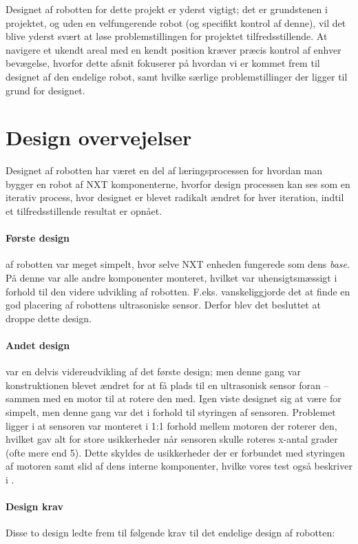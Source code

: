 Designet af robotten for dette projekt er yderst vigtigt; det er grundstenen i projektet, og uden en velfungerende robot (og specifikt kontrol af denne), vil det blive yderst svært at løse problemstillingen for projektet tilfredsstillende.
At navigere et ukendt areal med en kendt position kræver præcis kontrol af enhver bevægelse, hvorfor dette afsnit fokuserer på hvordan vi er kommet frem til designet af den endelige robot, samt hvilke særlige problemstillinger der ligger til grund for designet.

\section{Design overvejelser}\label{robot:design}
Designet af robotten har været en del af læringsprocessen for hvordan man bygger en robot af \lego NXT komponenterne, hvorfor design processen kan ses som en iterativ process, hvor designet er blevet radikalt ændret for hver iteration, indtil et tilfredsstillende resultat er opnået.


\paragraph{Første design} af robotten var meget simpelt, hvor selve NXT enheden fungerede som dens \textit{base}.
På denne var alle andre komponenter monteret, hvilket var uhensigtsmæssigt i forhold til den videre udvikling af robotten.
F.eks. vanskeliggjorde det at finde en god placering af robottens ultrasoniske sensor.
Derfor blev det besluttet at droppe dette design.

\paragraph{Andet design} var en delvis videreudvikling af det første design; men denne gang var konstruktionen blevet ændret for at få plads til en ultrasonisk sensor foran -- sammen med en motor til at rotere den med.
Igen viste designet sig at være for simpelt, men denne gang var det i forhold til styringen af sensoren.
Problemet ligger i at sensoren var monteret i 1:1 forhold mellem motoren der roterer den, hvilket gav alt for store usikkerheder når sensoren skulle roteres x-antal grader (ofte mere end 5\degree).
Dette skyldes de usikkerheder der er forbundet med styringen af motoren samt slid af dens interne komponenter, hvilke vores test også beskriver i .

\paragraph{Design krav}
Disse to design ledte frem til følgende krav til det endelige design af robotten:

